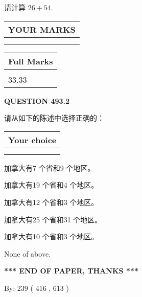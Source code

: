 \documentclass{ctexart}
\begin{document}
  
 
请计算 $ %
26 +  %
54 $.
 

 

 
  
\vspace{0.2in}
  
\noindent\begin{tabular}{|l|}
\hline
 YOUR MARKS  \\
\hline
 \\ 
 \\ 
\hline
\end{tabular}
\hspace{0.05in} \begin{tabular}{|l|}
\hline
 Full Marks  \\
\hline
 \\ 
33.33 \\
\hline
\end{tabular}
{\textbf{\Large{QUESTION
493.2 
}}}
  
  
请从如下的陈述中选择正确的：
  
  
\noindent\hspace{3.0in} \begin{tabular}{|l|}
\hline
Your choice \\
\hline
 \\ 
 \\ 
\hline
\end{tabular}
  
  
 
 
加拿大有7 个省和9 个地区。
 
 
加拿大有19 个省和4 个地区。
 
 
加拿大有12 个省和3 个地区。
 
 
加拿大有25 个省和31 个地区。
 
 
加拿大有10 个省和3 个地区。
 
 
 None of above.
 
 
   
   
 \vspace{0.2in}
 
   
   
   
   
\vspace{1.0in} 
{\textbf{\large{ *** END OF PAPER, THANKS *** }}} 
   
   
\hspace{1.0in} By: 
 239 ( 416 ,  613 )
   
\end{document}
